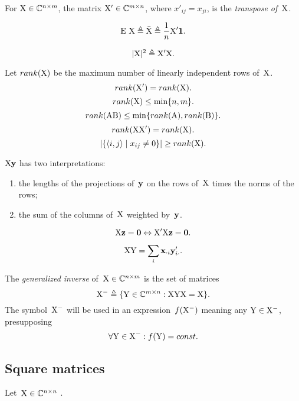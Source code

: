 \documentclass[10pt,a4paper]{article}
\theoremstyle{plain} \newtheorem{Lem}{Lemma}
\begin{document}
For $\mathrm X \in \mathbb C^{n \times m}$, the matrix $\mathrm X' \in \mathbb C^{m \times n}$, where $x'_{ij} = x_{ji}$, is the {\em transpose of~$\mathrm X$}.

$$ \mathrm E \  \mathrm X \triangleq \bar {\mathrm X} \triangleq \frac 1 n \mathrm X' \mathbf 1. $$

$$ |\mathrm X|^2 \triangleq \mathrm X' \mathrm X. $$

Let $rank(\mathrm X)$ be the maximum number of linearly independent rows of~$\mathrm X$.
$$ rank(\mathrm X') = rank(\mathrm X). $$
\comm { \proof {}}
$$ rank(\mathrm X) \le \min \{n, m\}. $$
$$ rank(\mathrm A \mathrm B) \le \min \{rank (\mathrm A), rank (\mathrm B)\}. $$
$$ rank(\mathrm X \mathrm X') = rank (\mathrm X). $$
\begin{equation} \label{rank_nonempty_cells}
  |\{\langle i, j \rangle \mid x_{ij} \ne 0\}| \ge rank(\mathrm X).
\end{equation}

$\mathrm X \mathbf y$ has two interpretations:
\begin{enumerate}
  \item the lengths of the projections of~$\mathbf y$ on the rows of~$\mathrm X$ times the norms of the rows;
  \item the sum of the columns of~$\mathrm X$ weighted by~$\mathbf y$.
\end{enumerate}

\begin{equation}\label{sim2dataCentered}
\mathrm X \mathbf z = \mathbf 0 \Leftrightarrow \mathrm X' \mathrm X \mathbf z = \mathbf 0.
\end{equation}

$$\mathrm X \mathrm Y = \sum_i \mathbf x_{\cdot i} \mathbf y_{i \cdot}'. $$

The {\em generalized inverse} of~$\mathrm X \in \mathbb C^{n \times m}$ is the set of matrices
$$\mathrm X^- \triangleq \{\mathrm Y \in \mathbb C^{m \times n} : \mathrm X \mathrm Y \mathrm X = \mathrm X\}. $$
The symbol~$\mathrm X^-$ will be used in an expression~$f(\mathrm X^-)$ meaning any $\mathrm Y \in \mathrm X^-$,
presupposing $$\forall \mathrm Y \in \mathrm X^- : f(\mathrm Y) = const. $$



\subsection{Square matrices}

Let~$\mathrm X \in \mathbb C^{n \times n}$ .
\end{document}
